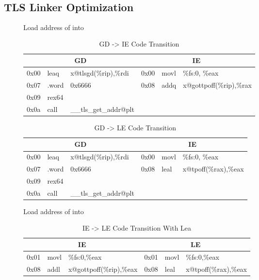 \subsection{TLS Linker Optimization}

\begin{description}
\item[]
  Load address of  into 

\begin{table}[H]
\Hrule
\caption{GD -> IE Code Transition}
\begin{center}
\code\small{
\begin{tabular}{lll|lll}
\multicolumn{3}{c}{GD} & \multicolumn{3}{c}{IE} \\
\hline
0x00 & leaq  & x@tlsgd(\%rip),\%rdi	& 0x00 & movl  & \%fs:0, \%eax \\
0x07 & .word & 0x6666			& 0x08 & addq  & x@gottpoff(\%rip),\%rax\\
0x09 & rex64 &				&      &       & \\
0x0a & call  & \_\_tls\_get\_addr@plt	&      &       & \\
\end{tabular}
}
\end{center}
\Hrule
\end{table}

\begin{table}[H]
\Hrule
\caption{GD -> LE Code Transition}
\begin{center}
\code\small{
\begin{tabular}{lll|lll}
\multicolumn{3}{c}{GD} & \multicolumn{3}{c}{IE} \\
\hline
0x00 & leaq  & x@tlsgd(\%rip),\%rdi	& 0x00 & movl  & \%fs:0, \%eax \\
0x07 & .word & 0x6666			& 0x08 & leal  & x@tpoff(\%rax),\%eax\\
0x09 & rex64 &				&      &       & \\
0x0a & call  & \_\_tls\_get\_addr@plt	&      &       & \\
\end{tabular}
}
\end{center}
\Hrule
\end{table}

\item[]
  Load address of  into 

\begin{table}[H]
\Hrule
\caption{IE -> LE Code Transition With Lea}
\begin{center}
\code\small{
\begin{tabular}{lll|lll}
\multicolumn{3}{c}{IE} & \multicolumn{3}{c}{LE} \\
\hline
0x01 & movl & \%fs:0,\%eax		& 0x01 & movl & \%fs:0,\%eax \\
0x08 & addl & x@gottpoff(\%rip),\%eax	& 0x08 & leal & x@tpoff(\%rax),\%eax \\
\end{tabular}
}
\end{center}
\Hrule
\end{table}


\end{description}
